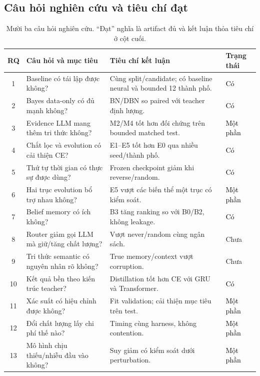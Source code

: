 \documentclass[runningheads]{llncs}
\newcommand{\good}{\textcolor{black}{Có}}
\newcommand{\partialok}{\textcolor{black}{Một phần}}
\begin{document}
\subsection{Câu hỏi nghiên cứu và tiêu chí đạt}

\begin{table}[!htbp]
\caption{Mười ba câu hỏi nghiên cứu. ``Đạt'' nghĩa là artifact đủ và kết luận thỏa tiêu chí ở cột cuối.}
\label{tab:rqs}
\centering
\scriptsize
\begin{tabularx}{\textwidth}{@{}c X X l@{}}
\toprule
RQ & Câu hỏi và mục tiêu & Tiêu chí kết luận & Trạng thái\\
\midrule
1 & Baseline có tái lập được không? & Cùng split/candidate; có baseline neural và bounded 12 thành phố. & \good\\
2 & Bayes data-only có đủ mạnh không? & BN/DBN so paired với teacher định lượng. & \good\\
3 & Evidence LLM mang thêm tri thức không? & M2/M4 tốt hơn đối chứng trên bounded matched test. & \partialok\\
4 & Chắt lọc và evolution có cải thiện CE? & E1--E5 tốt hơn E0 qua nhiều seed/thành phố. & \good\\
5 & Thứ tự thời gian có thực sự được dùng? & Frozen checkpoint giảm khi reverse/random. & \good\\
6 & Hai trục evolution bổ trợ nhau không? & E5 vượt các biến thể một trục có kiểm soát. & \partialok\\
7 & Belief memory có ích không? & B3 tăng ranking so với B0/B2, không leakage. & \good\\
8 & Router giảm gọi LLM mà giữ/tăng chất lượng? & Vượt never/random cùng ngân sách. & Chưa\\
9 & Tri thức semantic có nguyên nhân rõ không? & True memory/context vượt corruption. & Chưa\\
10 & Kết quả bền theo kiến trúc teacher? & Distillation tốt hơn CE với GRU và Transformer. & \good\\
11 & Xác suất có hiệu chỉnh được không? & Fit validation; cải thiện mục tiêu trên test. & \partialok\\
12 & Đổi chất lượng lấy chi phí thế nào? & Timing cùng harness, không contention. & \partialok\\
13 & Mô hình chịu thiếu/nhiễu đầu vào không? & Suy giảm có kiểm soát dưới perturbation. & \partialok\\
\bottomrule
\end{tabularx}
\end{table}
\end{document}
